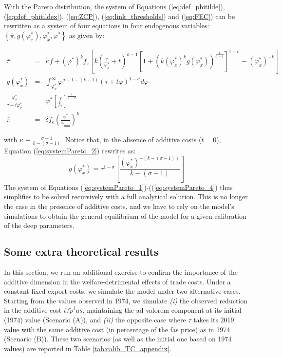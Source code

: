 \documentclass[a4paper,11pt]{article}
\begin{document}
With the Pareto distribution, the system of Equations (\ref{eq:def_phitilde}), (\ref{eq:def_phitildex}), (\ref{eq:ZCP}), (\ref{eq:link_thresholds}) and (\ref{eq:FEC}) can be rewritten as a system of four equations in four endogenous variables: $\left\{\bar{\pi}, g(\varphi_x^\ast),\varphi_x^\ast, \varphi^\ast  \right\}$ as given by:

\begin{eqnarray}
\bar{\pi}&=& \kappa f + \left(\varphi^\ast \right)^k f_x\left[k\left(\frac{\tau}{\varphi_x^\ast}+t  \right)^{\sigma-1}\left[  1+(k(\varphi_x^\ast)^k g(\varphi_x^\ast))^{\frac{1}{\sigma-1}}\right]^{1-\sigma}  - \left( \varphi_x^\ast \right)^{-k} \right] \label{eq:systemPareto_1}\\
g(\varphi_x^\ast)&=&\int_{\varphi_x^\ast}^\infty \varphi^{\sigma-1-(k+1)}(\tau +t\varphi)^{1-\sigma}d\varphi \label{eq:systemPareto_2} \\
\frac{\varphi_x^\ast}{\tau+ t\varphi_x^\ast}&=&\varphi^\ast \left[ \frac{f}{f_x} \right]^{\frac{1}{1-\sigma}} \label{eq:systemPareto_3}\\
\bar{\pi}&=& \delta f_e \left( \frac{\varphi^\ast}{\varphi_{\text{min}}} \right)^k \label{eq:systemPareto_4}
\end{eqnarray}

\noindent with $\kappa \equiv \frac{\sigma-1}{k-(\sigma-1)}$. Notice that, in the absence of additive costs ($t=0$), Equation (\ref{eq:systemPareto_2}) rewrites as:
$$g(\varphi_x^\ast) = \tau^{1-\sigma}\left[ \frac{(\varphi_x^\ast)^{-(k-(\sigma-1))}}{k-(\sigma-1)}\right]$$
The system of Equations (\ref{eq:systemPareto_1})-((\ref{eq:systemPareto_4}) thus simplifies to be solved recursively with a full analytical solution. This is no longer the case in the presence of additive costs, and we have to rely on the model's simulations to obtain the general equilibrium of the model for a given calibration of the deep parameters.


\subsection{Some extra theoretical results}

In this section, we run an additional exercise to confirm the importance of the additive dimension in the welfare-detrimental effects of trade costs. Under a constant fixed export costs, we simulate the model under two alternative cases. Starting from the values observed in 1974, we simulate \textit{(i)} the observed reduction in the additive cost $t/\widetilde{p}^fas$, maintaining the ad-valorem component at its initial (1974) value (Scenario (A)), and  \textit{(ii)} the opposite case where $\tau$ takes its 2019 value with the same additive cost (in percentage of the fas price) as in 1974 (Scenario (B)). These two scenarios (as well as the initial one based on 1974 values) are reported in Table \ref{tab:calib_TC_appendix}.
\end{document}
